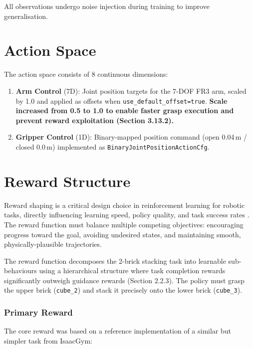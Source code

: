 \documentclass[12pt,a4paper,oneside]{report}
\begin{document}
All observations undergo noise injection during training to improve generalisation.

\section{Action Space}

The action space consists of 8 continuous dimensions:
\begin{enumerate}
    \item \textbf{Arm Control} (7D): Joint position targets for the 7-DOF FR3 arm, scaled by 1.0 and applied as offsets when \texttt{use\_default\_offset=true}. \textbf{Scale increased from 0.5 to 1.0 to enable faster grasp execution and prevent reward exploitation (Section 3.13.2).}
    \item \textbf{Gripper Control} (1D): Binary-mapped position command (open 0.04\,m / closed 0.0\,m) implemented as \texttt{BinaryJointPositionActionCfg}.
\end{enumerate}

\section{Reward Structure}

Reward shaping is a critical design choice in reinforcement learning for robotic tasks, directly influencing learning speed, policy quality, and task success rates \cite{sandeepmandrawadkarRLR15Reward2025b}. The reward function must balance multiple competing objectives: encouraging progress toward the goal, avoiding undesired states, and maintaining smooth, physically-plausible trajectories.

The reward function decomposes the 2-brick stacking task into learnable sub-behaviours using a hierarchical structure where task completion rewards significantly outweigh guidance rewards (Section 2.2.3). The policy must grasp the upper brick (\texttt{cube\_2}) and stack it precisely onto the lower brick (\texttt{cube\_3}).

\subsubsection{Primary Reward}

The core reward was based on a reference implementation of a similar but simpler task from IsaacGym\cite{argallSurveyRobotLearning2009}:
\end{document}
